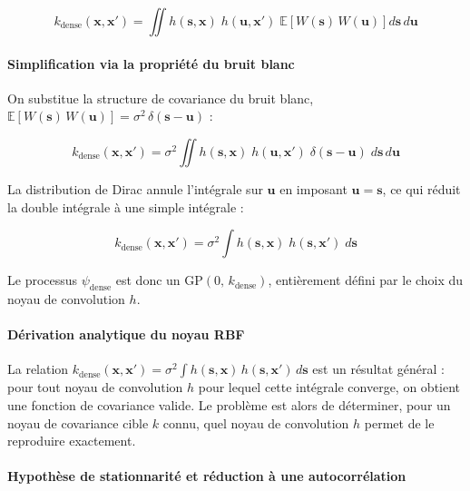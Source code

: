 \begin{equation}
k_{\text{dense}}(\mathbf{x},\mathbf{x}') = \iint h(\mathbf{s}, \mathbf{x})\; h(\mathbf{u}, \mathbf{x}')\; \mathbb{E}\!\left[W(\mathbf{s})\,W(\mathbf{u})\right] d\mathbf{s}\, d\mathbf{u}
\end{equation}

\paragraph{Simplification via la propriété du bruit blanc}

On substitue la structure de covariance du bruit blanc, $\mathbb{E}[W(\mathbf{s})\,W(\mathbf{u})] = \sigma^2\,\delta(\mathbf{s}-\mathbf{u})$ :

\begin{equation}
k_{\text{dense}}(\mathbf{x},\mathbf{x}') = \sigma^2 \iint h(\mathbf{s}, \mathbf{x})\; h(\mathbf{u}, \mathbf{x}')\; \delta(\mathbf{s} - \mathbf{u})\; d\mathbf{s}\, d\mathbf{u}
\end{equation}

La distribution de Dirac annule l'intégrale sur $\mathbf{u}$ en imposant $\mathbf{u} = \mathbf{s}$, ce qui réduit la double intégrale à une simple intégrale :

\begin{equation}
\boxed{k_{\text{dense}}(\mathbf{x},\mathbf{x}') = \sigma^2 \int h(\mathbf{s}, \mathbf{x})\; h(\mathbf{s}, \mathbf{x}')\; d\mathbf{s}}
\end{equation}

Le processus $\psi_{\text{dense}}$ est donc un $\text{GP}(0,\, k_{\text{dense}})$, entièrement défini par le choix du noyau de convolution $h$.

\paragraph{Dérivation analytique du noyau RBF}

La relation $k_{\text{dense}}(\mathbf{x},\mathbf{x}') = \sigma^2 \int h(\mathbf{s}, \mathbf{x})\, h(\mathbf{s}, \mathbf{x}')\, d\mathbf{s}$ est un résultat général : pour tout noyau de convolution $h$ pour lequel cette intégrale converge, on obtient une fonction de covariance valide. Le problème est alors de déterminer, pour un noyau de covariance cible $k$ connu, quel noyau de convolution $h$ permet de le reproduire exactement.

\paragraph{Hypothèse de stationnarité et réduction à une autocorrélation}

